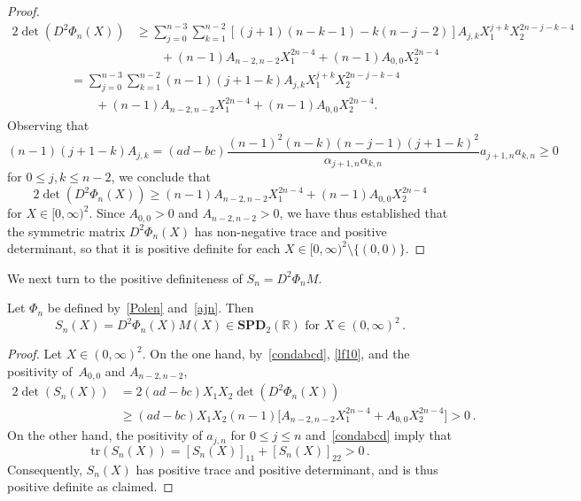 \documentclass[AHL,Unicode,longabstracts,published]{cedram}
\newcommand{\bbR}{\mathbb{R}}
\newcommand{\bSPD}{\mathbf{SPD}}
\newcommand{\trr}{\mathrm{tr}}
\begin{document}
\begin{proof}
\begin{align*}
2 \det\left(D^2\Phi_n(X)\right)& \ge \sum_{j=0}^{n-3} \sum_{k=1}^{n-2} \left[(j+1)(n-k-1) - k(n-j-2) \right] A_{j,k} X_1^{j+k} X_2^{2n-j-k-4} \\
& \qquad + (n-1) A_{n-2,n-2} X_1^{2n-4} + (n-1) A_{0,0} X_2^{2n-4}
\end{align*}
\begin{align*}
& = \sum_{j=0}^{n-3} \sum_{k=1}^{n-2} (n-1)(j+1-k) A_{j,k} X_1^{j+k} X_2^{2n-j-k-4} \\
& \qquad + (n-1) A_{n-2,n-2} X_1^{2n-4} + (n-1) A_{0,0} X_2^{2n-4}.
\end{align*}
Observing that
\begin{equation*}
(n-1)(j+1-k) A_{j,k} = (ad-bc) \frac{(n-1)^2(n-k)(n-j-1)(j+1-k)^2}{\alpha_{j+1,n}\alpha_{k,n}} a_{j+1,n} a_{k,n} \ge 0
\end{equation*}
for $0\le j, k\le n-2$, we conclude that
\begin{equation}\label{lf10}
2\det\left(D^2\Phi_n(X)\right) \ge (n-1) A_{n-2,n-2} X_1^{2n-4} + (n-1) A_{0,0} X_2^{2n-4} 
\end{equation}
for $X\in [0,\infty)^2$. Since $A_{0,0}>0$ and $A_{n-2,n-2}>0$, we have thus established that the symmetric matrix $D^2\Phi_n(X)$ has non-negative trace and positive determinant, so that it is positive definite for each $X\in [0,\infty)^2\setminus\{(0,0)\}$.
\end{proof}

We next turn to the positive definiteness of $S_n = D^2\Phi_n M$.


\begin{lemm}\label{lem.p3}
Let $\Phi_n$ be defined by~\eqref{Polen} and~\eqref{ajn}. Then
\[
S_n(X)=D^2\Phi_n(X)M(X)\in \bSPD_2(\bbR)\text{ for }X\in (0,\infty)^2\,.
\]
\end{lemm}


\begin{proof}
Let $X\in (0,\infty)^2$. On the one hand, by~\eqref{condabcd}, \eqref{lf10}, and the positivity of~$A_{0,0}$ and $A_{n-2,n-2}$,
\begin{align*}
2\det(S_n(X)) & = 2(ad-bc)X_1 X_2 \det\left(D^2\Phi_n(X)\right) \\
& \geq(ad-bc)X_1X_2(n-1) \Big[A_{n-2,n-2} X_1^{2n-4} + A_{0,0} X_2^{2n-4} \Big]>0\,.
\end{align*}
On the other hand, the positivity of $a_{j,n}$ for $0\le j \le n$ and~\eqref{condabcd} imply that
\begin{equation*}
\trr(S_n(X)) = [S_n(X)]_{11} + [S_n(X)]_{22}> 0\,.
\end{equation*}
Consequently, $S_n(X)$ has positive trace and positive determinant, and is thus positive definite as claimed.
\end{proof}
\end{document}
